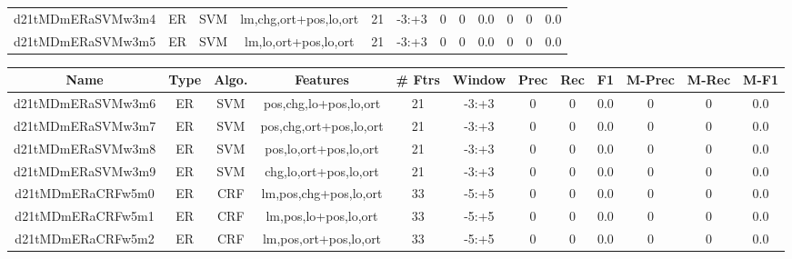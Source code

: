 \documentclass[a4paper]{article}
\begin{document}
\begin{landscape}
\begin{center}
\begin{tabular}{ |c|c|c|c|c|c|c|c|c|c|c|c|}
 
 	
 	\small{ d21tMDmERaSVMw3m4 } & ER & SVM & lm,chg,ort+pos,lo,ort  &  21 &  -3:+3  &  0 & 0 & 0.0  &  0 & 0 & 0.0 \\
 	

 
 	
 	\small{ d21tMDmERaSVMw3m5 } & ER & SVM & lm,lo,ort+pos,lo,ort  &  21 &  -3:+3  &  0 & 0 & 0.0  &  0 & 0 & 0.0 \\
 	
 \hline
\end{tabular}
\end{center}




\begin{center}
\begin{tabular}{ |c|c|c|c|c|c|c|c|c|c|c|c|} 
 \hline
 	Name & Type & Algo. & Features & \# Ftrs & Window & Prec & Rec & F1 & M-Prec & M-Rec & M-F1\\
 \hline

 	

 
 	
 	\small{ d21tMDmERaSVMw3m6 } & ER & SVM & pos,chg,lo+pos,lo,ort  &  21 &  -3:+3  &  0 & 0 & 0.0  &  0 & 0 & 0.0 \\
 	

 
 	
 	\small{ d21tMDmERaSVMw3m7 } & ER & SVM & pos,chg,ort+pos,lo,ort  &  21 &  -3:+3  &  0 & 0 & 0.0  &  0 & 0 & 0.0 \\
 	

 
 	
 	\small{ d21tMDmERaSVMw3m8 } & ER & SVM & pos,lo,ort+pos,lo,ort  &  21 &  -3:+3  &  0 & 0 & 0.0  &  0 & 0 & 0.0 \\
 	

 
 	
 	\small{ d21tMDmERaSVMw3m9 } & ER & SVM & chg,lo,ort+pos,lo,ort  &  21 &  -3:+3  &  0 & 0 & 0.0  &  0 & 0 & 0.0 \\
 	

 
 	
 	\small{ d21tMDmERaCRFw5m0 } & ER & CRF & lm,pos,chg+pos,lo,ort  &  33 &  -5:+5  &  0 & 0 & 0.0  &  0 & 0 & 0.0 \\
 	

 
 	
 	\small{ d21tMDmERaCRFw5m1 } & ER & CRF & lm,pos,lo+pos,lo,ort  &  33 &  -5:+5  &  0 & 0 & 0.0  &  0 & 0 & 0.0 \\
 	

 
 	
 	\small{ d21tMDmERaCRFw5m2 } & ER & CRF & lm,pos,ort+pos,lo,ort  &  33 &  -5:+5  &  0 & 0 & 0.0  &  0 & 0 & 0.0 \\
 	


\end{tabular}
\end{center}
\end{landscape}
\end{document}
